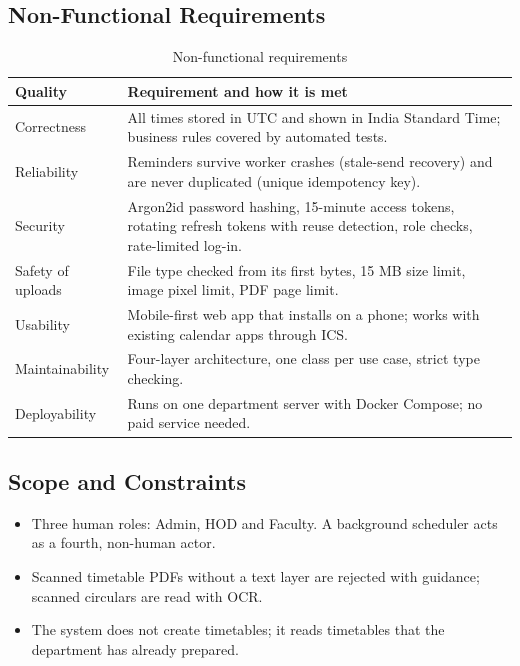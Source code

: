 \subsection{Non-Functional Requirements}
\begin{xltabular}{\textwidth}{|p{3.2cm}|Y|}
\caption{Non-functional requirements}\\
\hline
\textbf{Quality} & \textbf{Requirement and how it is met} \\ \hline
Correctness & All times stored in UTC and shown in India Standard Time; business rules covered by automated tests. \\ \hline
Reliability & Reminders survive worker crashes (stale-send recovery) and are never duplicated (unique idempotency key). \\ \hline
Security & Argon2id password hashing, 15-minute access tokens, rotating refresh tokens with reuse detection, role checks, rate-limited log-in. \\ \hline
Safety of uploads & File type checked from its first bytes, 15 MB size limit, image pixel limit, PDF page limit. \\ \hline
Usability & Mobile-first web app that installs on a phone; works with existing calendar apps through ICS. \\ \hline
Maintainability & Four-layer architecture, one class per use case, strict type checking. \\ \hline
Deployability & Runs on one department server with Docker Compose; no paid service needed. \\ \hline
\end{xltabular}

\subsection{Scope and Constraints}
\begin{itemize}
  \item Three human roles: Admin, HOD and Faculty. A background scheduler acts as a fourth, non-human actor.
  \item Scanned timetable PDFs without a text layer are rejected with guidance; scanned circulars are read with OCR.
  \item The system does not create timetables; it reads timetables that the department has already prepared.
\end{itemize}
